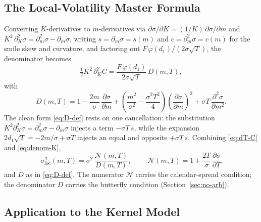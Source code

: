 \documentclass[11pt]{book}
\theoremstyle{plain}
\theoremstyle{definition}
\theoremstyle{remark}
\newcommand{\mln}{m}                             %
\newcommand{\sloc}{\sigma_{\mathrm{loc}}}        %
\newcommand{\npdf}{\varphi}                      %
\newcommand{\pd}[2]{\frac{\partial #1}{\partial #2}}          %
\newcommand{\pdd}[2]{\frac{\partial^2 #1}{\partial #2^2}}     %
\begin{document}
\subsection{The Local-Volatility Master Formula}
\label{sec:master-formula}

Converting $K$-derivatives to $\mln$-derivatives via
$\partial\sigma/\partial K = (1/K)\,\partial\sigma/\partial\mln$ and
$K^2\,\partial_K^2\sigma = \partial_\mln^2\sigma - \partial_\mln\sigma$, writing
$s = \partial_\mln\sigma = s(\mln)$ and $c = \partial_\mln^2\sigma = c(\mln)$ for
the smile skew and curvature, and factoring out
$F\,\npdf(d_1)/(2\sigma\sqrt{T})$, the denominator becomes
\begin{equation}\label{eq:denom-K}
\tfrac12 K^2\,\partial_K^2 C = \frac{F\,\npdf(d_1)}{2\sigma\sqrt{T}}\,D(\mln,T),
\end{equation}
with
\begin{equation}\label{eq:D-def}
D(\mln,T) = 1 - \frac{2\mln}{\sigma}\,\pd{\sigma}{\mln}
+ \left(\frac{\mln^2}{\sigma^2} - \frac{\sigma^2 T^2}{4}\right)\!
\left(\pd{\sigma}{\mln}\right)^{\!2}
+ \sigma T\,\pdd{\sigma}{\mln}.
\end{equation}
The clean form \eqref{eq:D-def} rests on one cancellation:
the substitution $K^2\partial_K^2\sigma = \partial_\mln^2\sigma -
\partial_\mln\sigma$ injects a term $-\sigma T\,s$, while the expansion
$2 d_1\sqrt{T} = -2\mln/\sigma + \sigma T$ injects an equal and opposite
$+\sigma T\,s$. Combining \eqref{eq:dT-C} and
\eqref{eq:denom-K},
\begin{equation}\label{eq:local-vol}
\boxed{\;\sloc^2(\mln,T) = \sigma^2\,\frac{\mathcal N(\mln,T)}{D(\mln,T)},\;}
\qquad
\mathcal N(\mln,T) = 1 + \frac{2T}{\sigma}\,\pd{\sigma}{T},
\end{equation}
and $D$ as in \eqref{eq:D-def}. The numerator $\mathcal N$ carries the
calendar-spread condition; the denominator $D$ carries the butterfly condition
(Section~\ref{sec:no-arb}).

\subsection{Application to the Kernel Model}
\label{sec:kernel-localvol}
\end{document}
